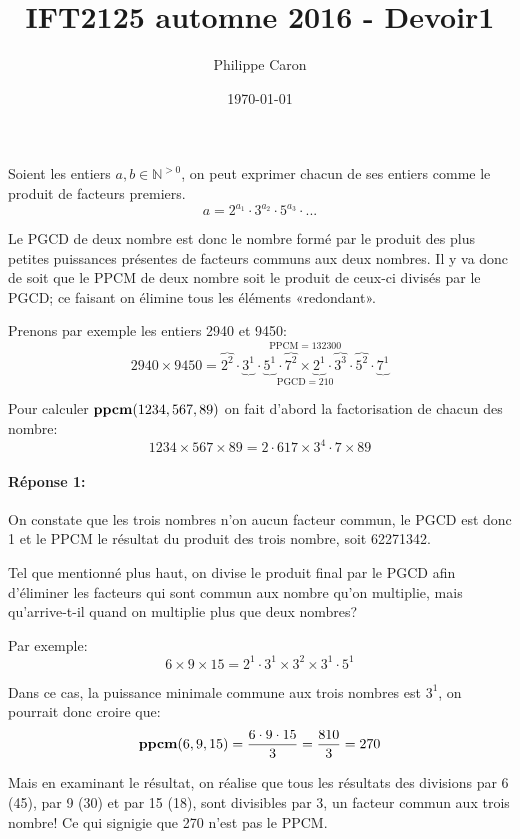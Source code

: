 \documentclass{article}
\title{IFT2125 automne 2016 - Devoir1} %
\author{Philippe Caron}
\date{\today}
\newcommand{\key}[1]{{\bf #1}}
\begin{document}
\maketitle
\section{}
Soient les entiers $a, b \in \mathbb{N}^{>0}$, on peut exprimer chacun de ses entiers comme le produit de facteurs premiers.
\begin{equation}
  a = 2^{a_1} \cdot 3^{a_2} \cdot 5^{a_3} \cdot ...
\end{equation}

Le PGCD de deux nombre est donc le nombre formé par le produit des plus petites puissances présentes de facteurs communs aux deux nombres. Il y va donc de soit que le PPCM de deux nombre soit le produit de ceux-ci divisés par le PGCD; ce faisant on élimine tous les éléments «redondant».

Prenons par exemple les entiers \num{2940} et \num{9450}:
$$
\num{2940} \times \num{9450} = \underset{\text{PGCD} = 210}{\stackrel{\text{PPCM} = \num{132300}}{\overbrace{2^2} \cdot \underbrace{3^1} \cdot \underbrace{5^1} \cdot \overbrace{7^2} \times \underbrace{2^1} \cdot \overbrace{3^3} \cdot \overbrace{5^2} \cdot \underbrace{7^1}}}
$$

Pour calculer $\key{ppcm}(\num{1234}, 567, 89)$ on fait d'abord la factorisation de chacun des nombre:
$$
\num{1234} \times 567 \times 89 = 2 \cdot 617 \times 3^4 \cdot 7 \times 89
$$

\paragraph{Réponse 1:}
On constate que les trois nombres n'on aucun facteur commun, le PGCD est donc 1 et le PPCM le résultat du produit des trois nombre, soit \num{62271342}.

Tel que mentionné plus haut, on divise le produit final par le PGCD afin d'éliminer les facteurs qui sont commun aux nombre qu'on multiplie, mais qu'arrive-t-il quand on multiplie plus que deux nombres?

Par exemple:
$$
6 \times 9 \times 15 = 2^1 \cdot 3^1 \times 3^2 \times 3^1 \cdot 5^1
$$

Dans ce cas, la puissance minimale commune aux trois nombres est $3^1$, on pourrait donc croire que:
$$
\key{ppcm}(6, 9, 15) = \frac{6 \cdot 9 \cdot 15}{3} = \frac{810}{3} = 270
$$

Mais en examinant le résultat, on réalise que tous les résultats des divisions par 6 (45), par 9 (30) et par 15 (18), sont divisibles par 3, un facteur commun aux trois nombre! Ce qui signigie que 270 n'est pas le PPCM.
\end{document}
